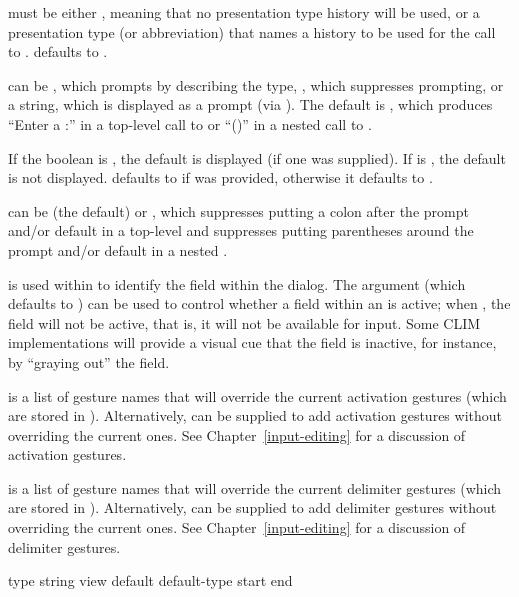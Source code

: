  must be either , meaning that no presentation type history
will be used, or a presentation type (or abbreviation) that names a history to
be used for the call to .   defaults to .

 can be , which prompts by describing the type, ,
which suppresses prompting, or a string, which is displayed as a prompt (via
).  The default is , which produces ``Enter a
:'' in a top-level call to  or ``()'' in a nested
call to .

If the boolean  is , the default is displayed
(if one was supplied).  If  is , the default is
not displayed.   defaults to  if 
was provided, otherwise it defaults to .

 can be  (the default) or , which
suppresses putting a colon after the prompt and/or default in a top-level
 and suppresses putting parentheses around the prompt and/or default
in a nested .

 is used within  to identify the
field within the dialog.  The  argument (which defaults to )
can be used to control whether a field within an  is
active; when , the field will not be active, that is, it will not be
available for input.  Some CLIM implementations will provide a visual cue that
the field is inactive, for instance, by ``graying out'' the field.

 is a list of gesture names that will override the
current activation gestures (which are stored in ).
Alternatively,  can be supplied to add
activation gestures without overriding the current ones.  See
Chapter~\ref{input-editing} for a discussion of activation gestures.

 is a list of gesture names that will override the
current delimiter gestures (which are stored in ).
Alternatively,  can be supplied to add
delimiter gestures without overriding the current ones.  See
Chapter~\ref{input-editing} for a discussion of delimiter gestures.


 {type string \key view default default-type start end}

